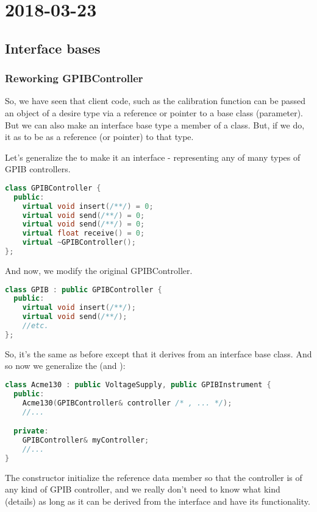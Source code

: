 \section{2018-03-23}

\subsection{Interface bases}

\subsubsection{Reworking GPIBController}

So, we have seen that client code, such as the calibration function can be passed an object of a desire type via a reference or pointer to a base class (parameter). But we can also make an interface base type a member of a class. But, if we do, it as to be as a reference (or pointer) to that type.

Let's generalize the  to make it an interface - representing any of many types of GPIB controllers.

\begin{lstlisting}[language=C++]
class GPIBController {
  public:
    virtual void insert(/**/) = 0;
    virtual void send(/**/) = 0;
    virtual void send(/**/) = 0;
    virtual float receive() = 0;
    virtual ~GPIBController();
};
\end{lstlisting}

And now, we modify the original GPIBController.

\begin{lstlisting}[language=C++]
class GPIB : public GPIBController {
  public:
    virtual void insert(/**/);
    virtual void send(/**/);
    //etc.
};
\end{lstlisting}

So, it's the same as before except that it derives from an interface base class. And so now we generalize the  (and ):

\begin{lstlisting}[language=C++]
class Acme130 : public VoltageSupply, public GPIBInstrument {
  public:
    Acme130(GPIBController& controller /* , ... */);
    //...

  private:
    GPIBController& myController;
    //...
}
\end{lstlisting}

The constructor initialize the reference data member so that the controller is of any kind of GPIB controller, and we really don't need to know what kind (details) as long as it can be derived from the interface and have its functionality.

